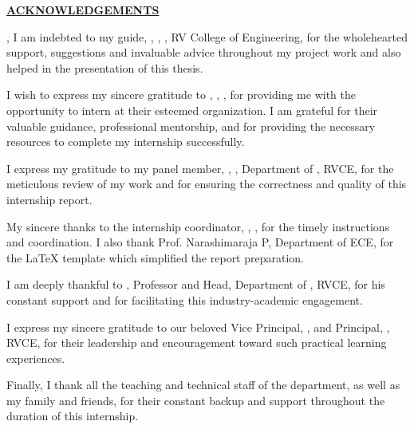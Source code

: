 \thispagestyle{empty}
\begin{center}
	\Large\textbf{\underline{ACKNOWLEDGEMENTS}} \par
\end{center}, 
I am indebted to my guide, \textbf{\printGuideNameA}, \printGuideDesigA, \printGuideDeptAInLF, RV College of Engineering, for the wholehearted support, suggestions and invaluable advice throughout my project work and also helped in the presentation of this thesis.

I wish to express my sincere gratitude to \textbf{\printGuideNameB}, \printGuideDesigB, \printGuideOrgB, for providing me with the opportunity to intern at their esteemed organization. I am grateful for their valuable guidance, professional mentorship, and for providing the necessary resources to complete my internship successfully.

I express my gratitude to my panel member, \textbf{\printPanelMemberA}, \printPanelMemberDesigA, Department of \printPanelMemberDeptAInSF, RVCE, for the meticulous review of my work and for ensuring the correctness and quality of this internship report.

My sincere thanks to the internship coordinator, \textbf{\printInternMemberA}, \printInternMemberDesigA, \printInternMemberDeptAInSF\;for the timely instructions and coordination. I also thank Prof. Narashimaraja P, Department of ECE, for the LaTeX template which simplified the report preparation.

I am deeply thankful to \textbf{\printHOD}, Professor and Head, Department of \printDepartmentLF, RVCE, for his constant support and for facilitating this industry-academic engagement.

I express my sincere gratitude to our beloved Vice Principal, \textbf{\printVicePrincipal}, and Principal, \textbf{\printPrincipal}, RVCE, for their leadership and encouragement toward such practical learning experiences.

Finally, I thank all the teaching and technical staff of the \printDepartmentLF department, as well as my family and friends, for their constant backup and support throughout the duration of this internship.